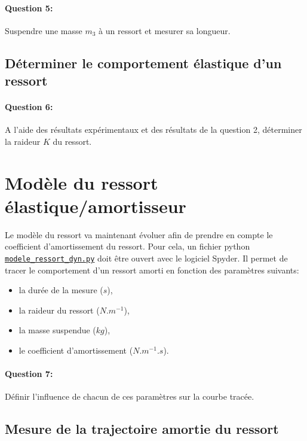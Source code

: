 \paragraph{Question 5:} Suspendre une masse $m_3$ à un ressort et mesurer sa longueur.

\subsection{Déterminer le comportement élastique d'un ressort}

\paragraph{Question 6:} A l'aide des résultats expérimentaux et des résultats de la question 2, déterminer la raideur $K$ du ressort.

\section{Modèle du ressort élastique/amortisseur}  

Le modèle du ressort va maintenant évoluer afin de prendre en compte le coefficient d'amortissement du ressort. Pour cela, un fichier python  
\href{https://github.com/Costadoat/Sciences-Ingenieur/raw/master/S01\%20Analyse\%20fonctionnelle/TP01\%20Mod\%C3\%A9lisation\%20lin\%C3\%A9aire/Ilot_02\%20Ressort/modele_ressort_dyn.py}{\texttt{modele\_ressort\_dyn.py}} doit être ouvert avec le logiciel Spyder. Il permet de tracer le comportement d'un ressort amorti en fonction des paramètres suivants:
\begin{itemize}
 \item la durée de la mesure ($s$),
 \item la raideur du ressort ($N.m^{-1}$),
 \item la masse suspendue ($kg$),
 \item le coefficient d'amortissement ($N.m^{-1}.s$).
\end{itemize}

\paragraph{Question 7:} Définir l'influence de chacun de ces paramètres sur la courbe tracée.

\subsection{Mesure de la trajectoire amortie du ressort}

